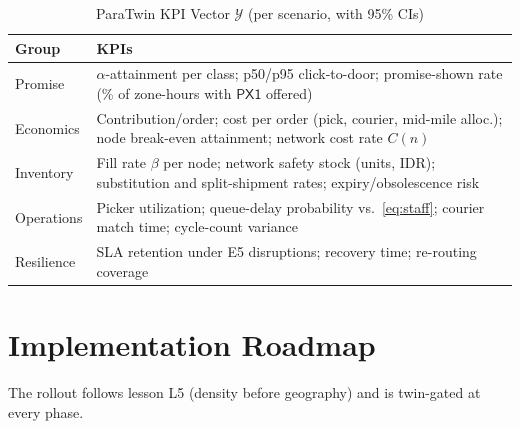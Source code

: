 \documentclass[journal]{IEEEtran}
\begin{document}
\begin{table}[!t]
\caption{ParaTwin KPI Vector $\mathcal{Y}$ (per scenario, with 95\% CIs)}
\label{tab:kpi}
\centering
\scriptsize
\begin{tabularx}{\columnwidth}{@{}l X@{}}
\toprule
\textbf{Group} & \textbf{KPIs} \\
\midrule
Promise & $\alpha$-attainment per class; p50/p95 click-to-door; promise-shown rate (\% of zone-hours with $\mathsf{PX1}$ offered) \\
Economics & Contribution/order; cost per order (pick, courier, mid-mile alloc.); node break-even attainment; network cost rate $C(n)$ \\
Inventory & Fill rate $\beta$ per node; network safety stock (units, IDR); substitution and split-shipment rates; expiry/obsolescence risk \\
Operations & Picker utilization; queue-delay probability vs.\ \eqref{eq:staff}; courier match time; cycle-count variance \\
Resilience & SLA retention under E5 disruptions; recovery time; re-routing coverage \\
\bottomrule
\end{tabularx}
\end{table}

\section{Implementation Roadmap}
\label{sec:roadmap}
The rollout follows lesson L5 (density before geography) and is twin-gated at every phase.
\end{document}
